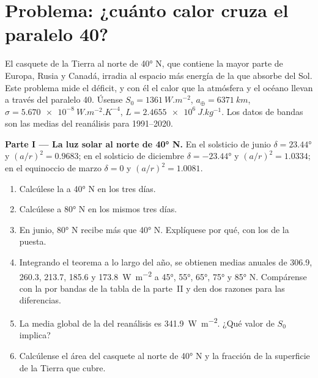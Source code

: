 \section{Problema: ¿cuánto calor cruza el paralelo 40?}

\begin{problem}
\label{pb:b1:radiation-heat-transport:1}
El casquete de la Tierra al norte de \ang{40} N, que contiene la mayor parte de Europa, Rusia y Canadá, irradia al espacio más energía de la que absorbe del Sol. Este problema mide el déficit, y con él el calor que la atmósfera y el océano llevan a través del paralelo 40. Úsense $S_0 = \qty{1361}{W.m^{-2}}$,
$a_\oplus = \qty{6371}{km}$, $\sigma = \qty{5.670e-8}{W.m^{-2}.K^{-4}}$, $L =
\qty{2.4655e6}{J.kg^{-1}}$. Los datos de bandas son las medias del reanálisis para 1991--2020.

\medskip
\noindent\textbf{Parte I --- La luz solar al norte de \ang{40} N.} En el solsticio de junio
$\delta = \ang{23.44}$ y $(a/r)^2 = 0.9683$; en el solsticio de diciembre $\delta =
\ang{-23.44}$ y $(a/r)^2 = 1.0334$; en el equinoccio de marzo $\delta = 0$ y
$(a/r)^2 = 1.0081$.
\begin{enumerate}
  \item Calcúlese la  a \ang{40} N en los tres días.
  \item Calcúlese a \ang{80} N en los mismos tres días.
  \item En junio, \ang{80} N recibe más que \ang{40} N. Explíquese por qué, con los  de la puesta.
  \item Integrando el teorema a lo largo del año, se obtienen medias anuales de
        \qty{306.9}{}, \qty{260.3}{}, \qty{213.7}{}, \qty{185.6}{} y
        \qty{173.8}{W.m^{-2}} a \ang{45}, \ang{55}, \ang{65}, \ang{75} y
        \ang{85} N. Compárense con la  por bandas de la tabla de la parte~II y den dos razones para las diferencias.
  \item La media global de la  del reanálisis es \qty{341.9}{W.m^{-2}}. ¿Qué valor de $S_0$ implica?
  \item Calcúlense el área del casquete al norte de \ang{40} N y la fracción de la superficie de la Tierra que cubre.
\end{enumerate}


\end{problem}
